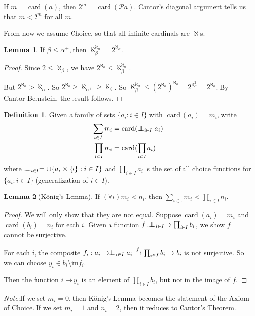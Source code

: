 \documentclass[a4paper]{article}
\theoremstyle{definition}
\newtheorem*{defi}{Definition}
\newtheorem*{lemma}{Lemma}
\newcommand{\note}{\noindent \emph{Note}:\;}
\newcommand{\Po}{\mathcal{P}}
\newcommand{\oadd}{\mathrel\bot\joinrel\mspace{-8mu}\mathrel\bot}
\DeclareMathOperator\card{card}
\begin{document}
If $m = \card (a)$, then $2^m = \card(\Po a)$. Cantor's diagonal argument tells us that $m < 2^m$ for all $m$.

From now we assume Choice, so that all infinite cardinals are $\aleph$s.

\begin{lemma}
  If $\beta \leq \alpha^+$, then $\aleph_\beta^{\aleph_\alpha} = 2^{\aleph_\alpha}$.
\end{lemma}

\begin{proof}
  Since $2 \leq \aleph_\beta$, we have $2^{\aleph_\alpha} \leq \aleph_\beta^{\aleph_\alpha}$.

  But $2^{\aleph_\alpha} > \aleph_\alpha$. So $2^{\aleph_\alpha}\geq \aleph_{\alpha^+} \geq \aleph_\beta$. So $\aleph_\beta^{\aleph_\alpha} \leq (2^{\aleph_\alpha})^{\aleph_\alpha} = 2^{\aleph_\alpha^2} = 2^{\aleph_\alpha}$. By Cantor-Bernstein, the result follows.
\end{proof}

\begin{defi}
  Given a family of sets $\{a_i: i \in I\}$ with $\card(a_i) = m_i$, write
  \begin{align*}
    \sum_{i \in I}m_i &= \card(\oadd_{i \in I} a_i)\\
    \prod_{i\in I}m_i &= \card(\prod_{i\in I} a_i)
  \end{align*}
  where $\oadd_{i\in I} = \cup\{a_i\times\{i\}: i\in I\}$ and $\prod_{i\in I}a_i$ is the set of all choice functions for $\{a_i: i\in I\}$ (generalization of $i\in I$).
\end{defi}

\begin{lemma}[K\"onig's Lemma]
  If $(\forall i)m_i < n_i$, then $\sum_{i\in I}m_i < \prod_{i\in I}n_i$.
\end{lemma}

\begin{proof}
  We will only show that they are not equal.
Suppose $\card(a_i) = m_i$ and $\card(b_i) = n_i$ for each $i$. Given a function $f: \oadd_{i\in I}\to \prod_{i\in I}b_i$, we show $f$ cannot be surjective.

For each $i$, the composite $f_i: a_i\to \oadd_{i\in I} a_i\xmapsto{f} \prod_{i\in I}b_i \to b_i$ is not surjective. So we can choose $y_i\in b_i\setminus\mathrm{im} f_i$. 

Then the function $i\mapsto y_i$ is an element of $\prod_{i\in I}b_i$, but not in the image of $f$.
\end{proof}
\note If we set $m_i = 0$, then K\"onig's Lemma becomes the statement of the Axiom of Choice. If we set $m_i =1 $ and $n_i = 2$, then it reduces to Cantor's Theorem.
\end{document}
